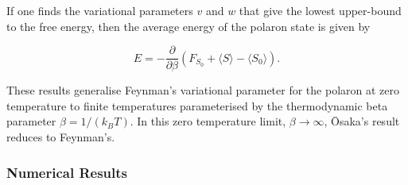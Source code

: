 If one finds the variational parameters $v$ and $w$ that give the lowest upper-bound to the free energy, then the average energy of the polaron state is given by

\begin{equation}
    E = -\frac{\partial}{\partial \beta} \left( F_{S_0} + \langle S\rangle - \langle S_0 \rangle \right).
\end{equation}

These results generalise Feynman's variational parameter for the polaron at zero temperature to finite temperatures parameterised by the thermodynamic beta parameter $\beta = 1 / (k_B T)$. In this zero temperature limit, $\beta \to \infty$, \=Osaka's result reduces to Feynman's.

\subsubsection{Numerical Results}

